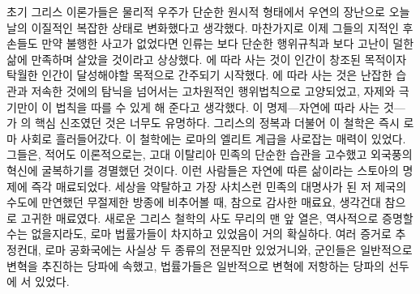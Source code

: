 초기 그리스 이론가들은 물리적 우주가 단순한 원시적 형태에서 우연의 장난으로
오늘날의 이질적인 복잡한 상태로 변화했다고 생각했다.
마찬가지로 이제 그들의 지적인 후손들도 만약 불행한 사고가 없었다면
인류는 보다 단순한 행위규칙과 보다 고난이 덜한 삶에 만족하며
살았을 것이라고 상상했다.
에 따라 사는 것이 인간이 창조된 목적이자
탁월한 인간이 달성해야할 목적으로 간주되기 시작했다.
에 따라 사는 것은 난잡한 습관과 저속한 것에의 탐닉을 넘어서는
고차원적인 행위법칙으로 고양되었고, 자제와 극기만이
이 법칙을 따를 수 있게 해 준다고 생각했다.
이 명제---자연에 따라 사는 것---가 의 핵심 신조였던 것은
너무도 유명하다.
그리스의 정복과 더불어 이 철학은 즉시 로마 사회로 흘러들어갔다.
이 철학에는 로마의 엘리트 계급을 사로잡는 매력이 있었다. 그들은, 적어도 이론적으로는,
고대 이탈리아 민족의 단순한 습관을 고수했고
외국풍의 혁신에 굴복하기를 경멸했던 것이다.
이런 사람들은 자연에 따른 삶이라는 스토아의 명제에 즉각 매료되었다.
세상을 약탈하고 가장 사치스런 민족의 대명사가 된 저 제국의 수도에 만연했던
무절제한 방종에 비추어볼 때, 참으로 감사한 매료요, 생각건대 참으로 고귀한 매료였다.
새로운 그리스 철학의 사도 무리의 맨 앞 열은,
역사적으로 증명할 수는 없을지라도, 로마 법률가들이 차지하고 있었음이 거의 확실하다.
여러 증거로 추정컨대,
로마 공화국에는 사실상 두 종류의 전문직만 있었거니와,
군인들은 일반적으로 변혁을 추진하는 당파에 속했고,
법률가들은 일반적으로 변혁에 저항하는 당파의 선두에 서 있었다.

